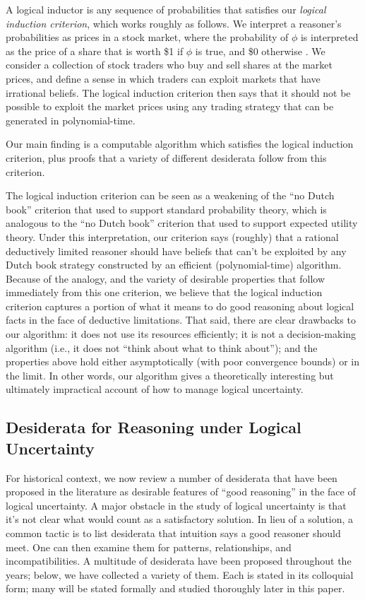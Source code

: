 \documentclass[authordate,onecolumn,noenvironments]{miri-tech-article}
\numberwithin{equation}{subsection}
\begin{document}
A logical inductor is any sequence of probabilities that satisfies our \emph{logical induction criterion}, which works roughly as follows. We interpret a reasoner's probabilities as prices in a stock market, where the probability of $\phi$ is interpreted as the price of a share that is worth \$1 if $\phi$ is true, and \$0 otherwise . We consider a collection of stock traders who buy and sell shares at the market prices, and define a sense in which traders can exploit markets that have irrational beliefs. The logical induction criterion then says that it should not be possible to exploit the market prices using any trading strategy that can be generated in polynomial-time.

Our main finding is a computable algorithm which satisfies the logical induction criterion, plus proofs that a variety of different desiderata follow from this criterion.

The logical induction criterion can be seen as a weakening of the ``no Dutch book'' criterion that \citet{Ramsey:1931,DeFinetti:1937:foresight} used to support standard probability theory, which is analogous to the ``no Dutch book'' criterion that \citet{Von-Neumann:1944} used to support expected utility theory. Under this interpretation, our criterion says (roughly) that a rational deductively limited reasoner should have beliefs that can't be exploited by any Dutch book strategy constructed by an efficient (polynomial-time) algorithm. Because of the analogy, and the variety of desirable properties that follow immediately from this one criterion, we believe that the logical induction criterion captures a portion of what it means to do good reasoning about logical facts in the face of deductive limitations. That said, there are clear drawbacks to our algorithm: it does not use its resources efficiently; it is not a decision-making algorithm (i.e., it does not ``think about what to think about''); and the properties above hold either asymptotically (with poor convergence bounds) or in the limit. In other words, our algorithm gives a theoretically interesting but ultimately impractical account of how to manage logical uncertainty.


\subsection{Desiderata for Reasoning under Logical Uncertainty}\label{sec:desiderata}
For historical context, we now review a number of desiderata that have been proposed in the literature as desirable features of ``good reasoning'' in the face of logical uncertainty. A major obstacle in the study of logical uncertainty is that it's not clear what would count as a satisfactory solution. In lieu of a solution, a common tactic is to list desiderata that intuition says a good reasoner should meet. One can then examine them for patterns, relationships, and incompatibilities. A multitude of desiderata have been proposed throughout the years; below, we have collected a variety of them. Each is stated in its colloquial form; many will be stated formally and studied thoroughly later in this paper.
\end{document}
